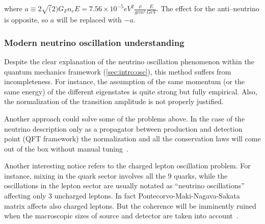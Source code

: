 \documentclass[../main.tex]{subfiles}
\begin{document}
where $a\equiv2\sqrt(2)G_Fn_eE=7.56\times10^{-5}eV^2\frac{\rho}{gcm^2}\frac{E}{GeV}$. The effect for the anti--neutrino is opposite, so $a$ will be replaced with $-a$.

\subsubsection{Modern neutrino oscillation understanding}
Despite the clear explanation of the neutrino oscillation phenomenon within the quantum mechanics framework (\autoref{sec:intro:osc}), this method suffers from incompleteness. For instance, the assumption of the same momentum (or the same energy) of the different eigenstates is quite strong but fully empirical. Also, the normalization of the transition amplitude is not properly justified.

Another approach could solve some of the problems above. In the case of the neutrino description only as a propagator between production and detection point (QFT framework) the normalization and all the conservation laws will come out of the box without manual tuning~\cite{Akhmedov2010a}.

Another interesting notice refers to the charged lepton oscillation problem. For instance, mixing in the quark sector involves all the 9 quarks, while the oscillations in the lepton sector are usually notated as ``neutrino oscillations'' affecting only 3 uncharged leptons. In fact Pontecorvo-Maki-Nagava-Sakata matrix affects also charged leptons. But the coherence will be imminently ruined when the macroscopic sizes of source and detector are taken into account~\cite{Akhmedov2007}.
\end{document}
